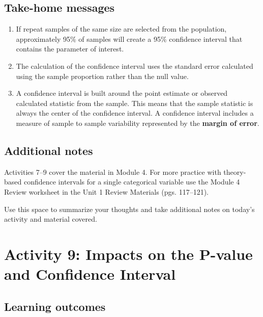 \documentclass[
]{report}
\begin{document}
\vspace{1in}

\newpage

\subsection{Take-home messages}\label{take-home-messages-7}

\begin{enumerate}
\def\labelenumi{\arabic{enumi}.}
\item
  If repeat samples of the same size are selected from the population, approximately 95\% of samples will create a 95\% confidence interval that contains the parameter of interest.
\item
  The calculation of the confidence interval uses the standard error calculated using the sample proportion rather than the null value.
\item
  A confidence interval is built around the point estimate or observed calculated statistic from the sample. This means that the sample statistic is always the center of the confidence interval. A confidence interval includes a measure of sample to sample variability represented by the \textbf{margin of error}.
\end{enumerate}

\subsection{Additional notes}\label{additional-notes-7}

Activities 7--9 cover the material in Module 4. For more practice with theory-based confidence intervals for a single categorical variable use the Module 4 Review worksheet in the Unit 1 Review Materials (pgs. 117--121).

Use this space to summarize your thoughts and take additional notes on today's activity and material covered.

\newpage

\section{Activity 9: Impacts on the P-value and Confidence Interval}\label{activity-9-impacts-on-the-p-value-and-confidence-interval}


\subsection{Learning outcomes}\label{learning-outcomes-8}
\end{document}
